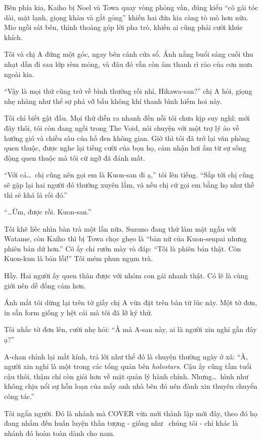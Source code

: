 \documentclass[../main.tex]{subfiles}
\begin{document}
Bên phía kia, Kaiho bị Noel và Towa quay vòng phỏng vấn, đúng kiểu ``cô gái tóc dài, mặt lạnh, giọng khàn và gắt gỏng'' khiến hai đứa kia càng tò mò hơn nữa. Mio ngồi sát bên, thỉnh thoảng góp lời pha trò, khiến ai cũng phải cười khúc khích.

Tôi và chị A đứng một góc, ngay bên cánh cửa sổ. Ánh nắng buổi sáng cuối thu nhạt dần đi sau lớp rèm mỏng, và đâu đó vẫn còn âm thanh rì rào của cơn mưa ngoài kia.

``Vậy là mọi thứ cũng trở về bình thường rồi nhỉ, Hikawa-san?'' chị A hỏi, giọng nhẹ nhàng như thể sợ phá vỡ bầu không khí thanh bình hiếm hoi này.

Tôi chỉ biết gật đầu. Mọi thứ diễn ra nhanh đến nỗi tôi chưa kịp suy nghĩ; mới đây thôi, tôi còn đang ngồi trong The Void, nói chuyện với một trợ lý ảo về hướng gió và chiều sâu của hố đen không gian. Giờ thì tôi đã trở lại văn phòng quen thuộc, được nghe lại tiếng cười của bọn họ, cảm nhận hơi ấm từ sự sống động quen thuộc mà tôi cứ ngỡ đã đánh mất.

``Với cả\dots\ chị cũng nên gọi em là Kuon-san đi ạ,'' tôi lên tiếng. ``Sắp tới chị cũng sẽ gặp lại hai người đó thường xuyên lắm, và nếu chị cứ gọi em bằng họ như thế thì sẽ khá là rối đó.''

``\dots Ừm, được rồi. Kuon-san.''

Tôi khẽ liếc nhìn bàn trà một lần nữa. Suzuno đang thử làm mặt ngầu với Watame, còn Kaiho thì bị Towa chọc ghẹo là ``bản nữ của Kuon-senpai nhưng phiên bản dữ hơn.'' Cô ấy chỉ rướn mày và đáp: ``Tôi là phiên bản thật. Còn Kuon-kun là bản lỗi!'' Tôi mém phun ngụm trà.

Hầy. Hai người ấy quen thân được với nhóm con gái nhanh thật. Có lẽ là cùng giới nên dễ đồng cảm hơn.

Ánh mắt tôi dừng lại trên tờ giấy chị A vừa đặt trên bàn từ lúc nãy. Một tờ đơn, in sẵn form giống y hệt cái mà tôi đã lỡ ký thử.

Tôi nhấc tờ đơn lên, cười nhẹ hỏi: ``À mà A-san này, ai là người xin nghỉ gần đây ạ?''

A-chan chỉnh lại mắt kính, trả lời như thể đó là chuyện thường ngày ở xã: ``À, người xin nghỉ là một trong các tổng quản bên \textit{holostars}. Cậu ấy cũng tầm tuổi cậu thôi, thậm chí còn giỏi hơn về mặt quản lý hành chính. Nhưng\dots\ hình như không chịu nổi sự hỗn loạn của mấy anh nhà bên đó nên đành xin thuyên chuyển công tác.''

Tôi ngẩn người. Đó là nhánh mà COVER vừa mới thành lập mới đây, theo đó họ đang nhắm đến huấn luyện thần tượng - giống như \hll\ chúng tôi - chỉ khác là nhánh đó hoàn toàn dành cho nam.
\end{document}
